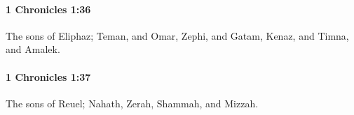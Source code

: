 		\paragraph{1 Chronicles 1:36} %
			\label{1CHRONICLES-1-36}

			The sons of Eliphaz; Teman, and Omar, Zephi, and Gatam, Kenaz, and Timna, and Amalek.


		\paragraph{1 Chronicles 1:37} %
			\label{1CHRONICLES-1-37}

			The sons of Reuel; Nahath, Zerah, Shammah, and Mizzah.


